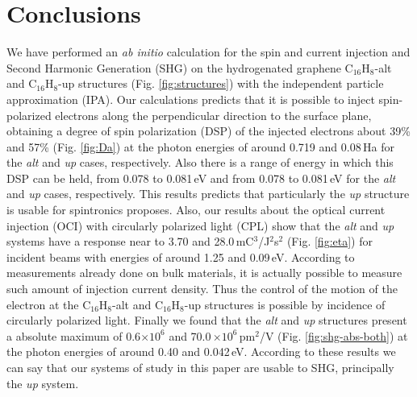 \documentclass[aps,pra,11pt,tightenlines,showpacs,superscriptaddress,groupedaddress]{revtex4-1}
\newcommand{\altstc}{C$_{16}$H$_{8}$-alt}
\newcommand{\upstc}{C$_{16}$H$_{8}$-up}
\begin{document}

\section{Conclusions} %
\label{sec:conclusions}

We have performed an \emph{ab initio} calculation for the spin and current injection and
Second Harmonic Generation (SHG) on the hydrogenated graphene {\altstc} and
{\upstc} structures (Fig. \ref{fig:structures}) with the
independent particle approximation (IPA). Our calculations predicts that it is
possible to inject spin-polarized electrons along the perpendicular direction
to the surface plane, obtaining a degree of spin polarization (DSP) of the
injected electrons about 39\% and 57\%  (Fig. \ref{fig:Da}) at the photon energies of around 0.719
and 0.08\,Ha  for the \emph{alt} and \emph{up} cases, respectively. Also there is a range of energy
in which this DSP can be held, from 0.078 to 0.081\,eV and from 0.078 to 0.081\,eV for the \emph{alt} and \emph{up} cases, respectively. This results predicts that particularly
the \emph{up} structure is usable for spintronics proposes. Also, our results
about the optical current injection (OCI) with circularly polarized light (CPL)
show that the \emph{alt}  and \emph{up} systems have a response near to 3.70
and 28.0\,mC$^{3}$/J$^{2}$s$^{2}$ (Fig. \ref{fig:eta}) for incident beams with energies of around
1.25 and 0.09\,eV. According to measurements already done on bulk materials, it
is actually possible to measure such amount of injection current density. Thus 
the control of the motion of the electron at the
{\altstc} and {\upstc} structures is possible by incidence of circularly
polarized light. Finally we found that the \emph{alt} and \emph{up} structures
present a absolute maximum of 0.6$\times 10^{6}$ and 70.0\,$\times 10^{6}
$\,pm$^{2}$/V (Fig. \ref{fig:shg-abs-both}) at the photon energies of around 0.40 and 0.042\,eV.
According to these results we can say that our systems of study in this paper are
usable to SHG, principally the \emph{up} system.


\end{document}
